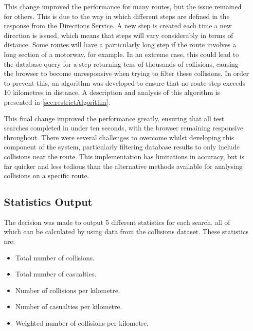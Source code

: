 \documentclass[authoryearcitations]{UoYCSproject}
\begin{document}
This change improved the performance for many routes, but the issue remained for others. This is due to the way in which different steps are defined in the response from the Directions Service. A new step is created each time a new direction is issued, which means that steps will vary considerably in terms of distance. Some routes will have a particularly long step if the route involves a long section of a motorway, for example. In an extreme case, this could lead to the database query for a step returning tens of thousands of collisions, causing the browser to become unresponsive when trying to filter these collisions. In order to prevent this, an algorithm was developed to ensure that no route step exceeds 10 kilometres in distance. A description and analysis of this algorithm is presented in \autoref{sec:restrictAlgorithm}.

This final change improved the performance greatly, ensuring that all test searches completed in under ten seconds, with the browser remaining responsive throughout. There were several challenges to overcome whilst developing this component of the system, particularly filtering database results to only include collisions near the route. This implementation has limitations in accuracy, but is far quicker and less tedious than the alternative methods available for analysing collisions on a specific route.

\subsection{Statistics Output}

The decision was made to output 5 different statistics for each search, all of which can be calculated by using data from the collisions dataset. These statistics are:

\begin{itemize}
	\item Total number of collisions.
	\item Total number of casualties.
	\item Number of collisions per kilometre.
	\item Number of casualties per kilometre.
	\item Weighted number of collisions per kilometre.
\end{itemize}
\end{document}
